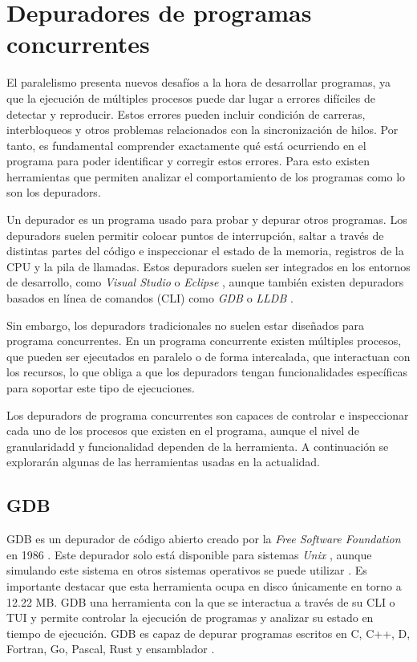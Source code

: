 \section{Depuradores de programas concurrentes}\label{sec:depuradores-programas-concurrentes}

El paralelismo presenta nuevos desafíos a la hora de desarrollar programas, ya que la ejecución de múltiples \glspl{proceso} puede dar lugar a errores difíciles de detectar y reproducir. Estos errores pueden incluir \glspl{condición de carrera}, \glspl{interbloqueo} y otros problemas relacionados con la sincronización de \glspl{hilo}. Por tanto, es fundamental comprender exactamente qué está ocurriendo en el programa para poder identificar y corregir estos errores. Para esto existen herramientas que permiten analizar el comportamiento de los programas como lo son los \glspl{depurador}. 

Un \gls{depurador} \cite{WikipediaDebugger} es un programa usado para probar y \gls{depurar} otros programas. Los \glspl{depurador} suelen permitir colocar puntos de interrupción, saltar a través de distintas partes del código e inspeccionar el estado de la memoria, registros de la \gls{CPU} y la pila de llamadas.
Estos \glspl{depurador} suelen ser integrados en los entornos de desarrollo, como \textit{Visual Studio} \cite{DebuggerVisualStudio} o \textit{Eclipse} \cite{DebuggerEclipse}, aunque también existen \glspl{depurador} basados en línea de comandos (\gls{CLI}) como \textit{GDB} \cite{GDB} o \textit{LLDB} \cite{LLDB}. 

Sin embargo, los \glspl{depurador} tradicionales no suelen estar diseñados para \glspl {programa concurrente}. En un \gls{programa concurrente} \cite{ParallelismComputerArchitecture} existen múltiples \glspl{proceso}, que pueden ser ejecutados en paralelo o de forma intercalada, que interactuan con los recursos, lo que obliga a que los \glspl{depurador} tengan funcionalidades específicas para soportar este tipo de ejecuciones.

Los \glspl{depurador} de \glspl{programa concurrente} son capaces de controlar e inspeccionar cada uno de los \glspl{proceso} que existen en el programa, aunque el nivel de granularidadd y funcionalidad dependen de la herramienta. A continuación se explorarán algunas de las herramientas usadas en la actualidad.

\subsection{GDB}{\label{subsec:gdb}}
GDB es un \gls{depurador} de \gls{código abierto} creado por la \textit{Free Software Foundation} en 1986 \cite{GDB}. Este \gls{depurador} solo está disponible para sistemas \textit{Unix} \cite{UNIX} , aunque simulando este sistema en otros sistemas operativos se puede utilizar \cite{GDBDownload}. Es importante destacar que esta herramienta ocupa en disco únicamente en torno a 12.22 MB. 
GDB una herramienta con la que se interactua a través de su \gls{CLI} o \gls{TUI} y permite controlar la ejecución de programas y analizar su estado en tiempo de ejecución. GDB es capaz de depurar programas escritos en C, C++, D, Fortran, Go, Pascal, Rust y \gls{ensamblador} \cite{GDB}.  

